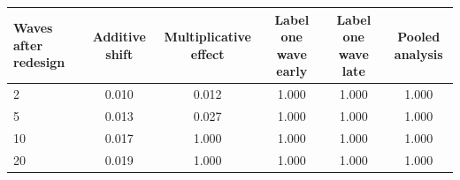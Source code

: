 \begin{tabular}{lccccc}
\toprule
Waves after redesign & Additive shift & Multiplicative effect & Label one wave early & Label one wave late & Pooled analysis \\
\midrule
2 & 0.010 & 0.012 & 1.000 & 1.000 & 1.000 \\
5 & 0.013 & 0.027 & 1.000 & 1.000 & 1.000 \\
10 & 0.017 & 1.000 & 1.000 & 1.000 & 1.000 \\
20 & 0.019 & 1.000 & 1.000 & 1.000 & 1.000 \\
\bottomrule
\end{tabular}
